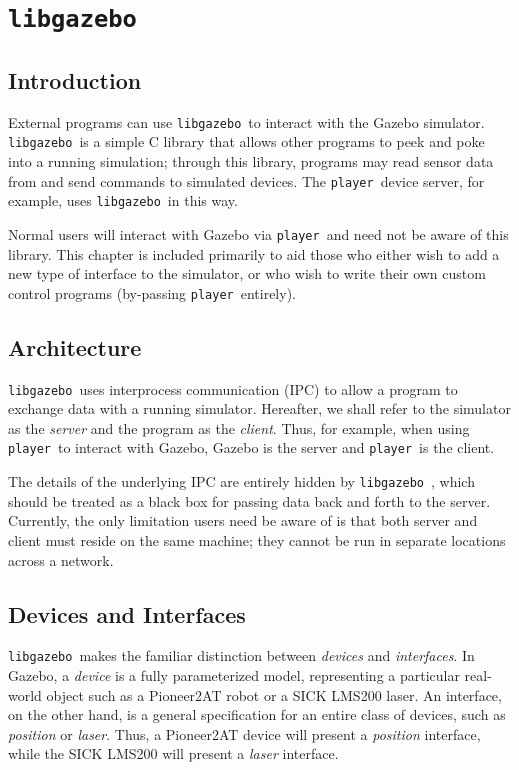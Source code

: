 \documentclass[11pt]{report}
\def\player {{\tt player}~}
\def\libgazebo {{\tt libgazebo}~}
\begin{document}

\chapter{\libgazebo}

\section{Introduction}

External programs can use \libgazebo to interact with the Gazebo
simulator.  \libgazebo is a simple C library that allows other
programs to peek and poke into a running simulation; through this
library, programs may read sensor data from and send commands to
simulated devices.  The \player device server, for example, uses
\libgazebo in this way.

Normal users will interact with Gazebo via \player and need not be
aware of this library.  This chapter is included primarily to aid
those who either wish to add a new type of interface to the simulator,
or who wish to write their own custom control programs (by-passing
\player entirely).


\section{Architecture}

\libgazebo uses interprocess communication (IPC) to allow a program to
exchange data with a running simulator.  Hereafter, we shall refer to
the simulator as the {\em server} and the program as the {\em client}.
Thus, for example, when using \player to interact with Gazebo,
Gazebo is the server and \player is the client.

The details of the underlying IPC are entirely hidden by \libgazebo,
which should be treated as a black box for passing data back and forth
to the server.  Currently, the only limitation users need be aware of
is that both server and client must reside on the same machine; they
cannot be run in separate locations across a network.


\section{Devices and Interfaces}

\libgazebo makes the familiar distinction between {\em devices} and
{\em interfaces}.  In Gazebo, a {\em device} is a fully parameterized
model, representing a particular real-world object such as a
Pioneer2AT robot or a SICK LMS200 laser.  An interface, on the other
hand, is a general specification for an entire class of devices, such
as {\em position} or {\em laser}.  Thus, a Pioneer2AT device will
present a {\em position} interface, while the SICK LMS200 will present
a {\em laser} interface.
\end{document}
